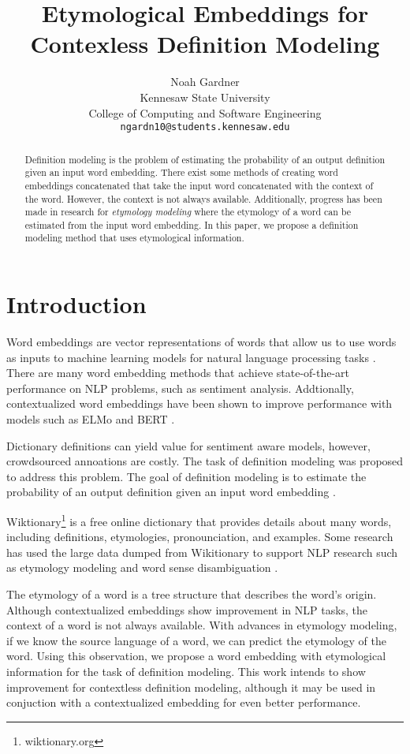 \documentclass[11pt,a4paper]{article}
\title{Etymological Embeddings for Contexless Definition Modeling}
\author{Noah Gardner \\
  Kennesaw State University \\
  College of Computing and Software Engineering \\
  \texttt{ngardn10@students.kennesaw.edu} \\}
\begin{document}
\maketitle
\begin{abstract}
  Definition modeling is the problem of estimating the probability of an output
  definition given an input word embedding. There exist some methods of creating
  word embeddings concatenated that take the input word concatenated with the
  context of the word. However, the context is not always available.
  Additionally, progress has been made in research for \textit{etymology
    modeling} where the etymology of a word can be estimated from the input word
  embedding. In this paper, we propose a definition modeling method that uses
  etymological information.
\end{abstract}

\section{Introduction}
Word embeddings are vector representations of words that allow us to use words
as inputs to machine learning models for natural language processing tasks
\cite{mikolov_efficient_2013}. There are many word embedding methods that
achieve state-of-the-art performance on NLP problems, such as sentiment
analysis. Addtionally, contextualized word embeddings have been shown to improve
performance with models such as ELMo and BERT \cite{peters_deep_2018,
  devlin_bert_2019}.

Dictionary definitions can yield value for sentiment aware models, however,
crowdsourced annoations are costly. The task of definition modeling was proposed
to address this problem. The goal of definition modeling is to estimate the
probability of an output definition given an input word embedding
\cite{noraset_definition_2016}.

Wiktionary\footnote{wiktionary.org} is a free online dictionary that provides
details about many words, including definitions, etymologies, pronounciation,
and examples. Some research has used the large data dumped from Wikitionary to
support NLP research such as etymology modeling and word sense disambiguation
\cite{wu_computational_2020}.

The etymology of a word is a tree structure that describes the word's origin.
Although contextualized embeddings show improvement in NLP tasks, the context of
a word is not always available. With advances in etymology modeling, if we know
the source language of a word, we can predict the etymology of the word. Using
this observation, we propose a word embedding with etymological information for
the task of definition modeling. This work intends to show improvement for
contextless definition modeling, although it may be used in conjuction with a
contextualized embedding for even better performance.
\end{document}
